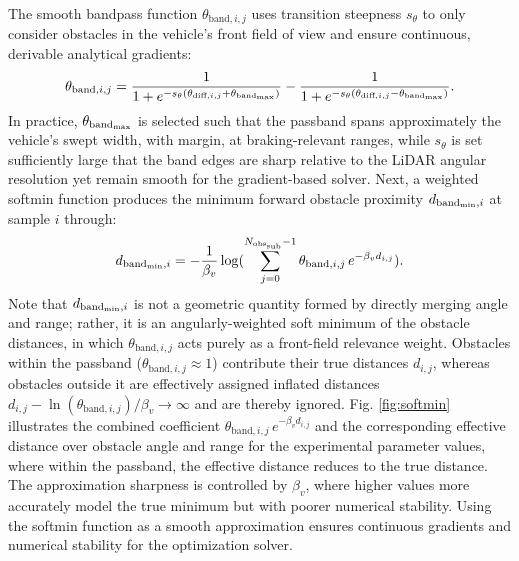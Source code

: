 \documentclass[journal]{IEEEtran}
\begin{document}
The smooth bandpass function $\theta_{\text{band},i,j}$ uses transition steepness $s_{\theta}$ to only consider obstacles in the vehicle's front field of view and ensure continuous, derivable analytical gradients:
\begin{equation}
    \theta_{\text{band},i,j}=\frac{1}{1+e^{-s_{\theta}(\theta_{\text{diff},i,j}+\theta_{\text{band}_{\textup{max}}})}}-\frac{1}{1+e^{-s_{\theta}(\theta_{\text{diff},i,j}-\theta_{\text{band}_{\textup{max}}})}}.
\end{equation}
In practice, $\theta_{\text{band}_{\textup{max}}}$ is selected such that the passband spans approximately the vehicle's swept width, with margin, at braking-relevant ranges, while $s_{\theta}$ is set sufficiently large that the band edges are sharp relative to the LiDAR angular resolution yet remain smooth for the gradient-based solver. Next, a weighted softmin function produces the minimum forward obstacle proximity $d_{\text{band}_\textup{min},i}$ at sample $i$ through:
\begin{equation}
    d_{\text{band}_\textup{min},i}=-\frac{1}{\beta_v}\log(\sum_{j=0}^{N_{\textup{obs}_\textup{sub}}-1}\theta_{\text{band},i,j}\,e^{-{\beta_v}d_{i,j}}).
    \label{5.3.11}
\end{equation}
Note that $d_{\text{band}_\textup{min},i}$ is not a geometric quantity formed by directly merging angle and range; rather, it is an angularly-weighted soft minimum of the obstacle distances, in which $\theta_{\text{band},i,j}$ acts purely as a front-field relevance weight. Obstacles within the passband ($\theta_{\text{band},i,j}\approx1$) contribute their true distances $d_{i,j}$, whereas obstacles outside it are effectively assigned inflated distances \mbox{$d_{i,j}-\ln(\theta_{\text{band},i,j})/\beta_v\rightarrow\infty$} and are thereby ignored. Fig. \ref{fig:softmin} illustrates the combined coefficient $\theta_{\text{band},i,j}\,e^{-\beta_v d_{i,j}}$ and the corresponding effective distance over obstacle angle and range for the experimental parameter values, where within the passband, the effective distance reduces to the true distance. The approximation sharpness is controlled by $\beta_v$, where higher values more accurately model the true minimum but with poorer numerical stability. Using the softmin function as a smooth approximation ensures continuous gradients and numerical stability for the optimization solver.
\end{document}
